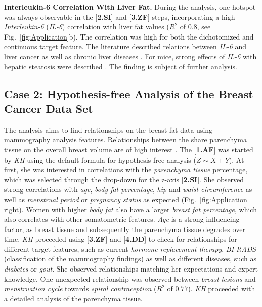 \documentclass[journal]{style/vgtc} 			          %
\begin{document}
\textbf{Interleukin-6 Correlation With Liver Fat.}
During the analysis, one hotspot was always observable in the [\textbf{2.SI}] and [\textbf{3.ZF}] steps, incorporating a high \emph{Interleukin-6} (\emph{IL-6}) correlation with liver fat values ($R^2$ of $0.8$, see Fig.~\ref{fig:Application}b).
The correlation was high for both the dichotomized and continuous target feature.
The literature described relations between \emph{IL-6} and liver cancer \cite{He2013} as well as chronic liver diseases \cite{Streetz2003}.
For mice, strong effects of \emph{IL-6} with hepatic steatosis were described \cite{Hong2004}.
The finding is subject of further analysis.
\subsection{Case 2: Hypothesis-free Analysis of the Breast Cancer Data Set}
The analysis aims to find relationships on the breast fat data using mammography analysis features.
Relationships between the share parenchyma tissue on the overall breast volume are of high interest \cite{Mccormack2006}.
The [\textbf{1.AF}] was started by \emph{KH} using the default formula for hypothesis-free analysis ($Z \sim X + Y$).
At first, she was interested in correlations with the \emph{parenchyma tissue} percentage, which was selected through the drop-down for the z-axis [\textbf{2.SI}].
She observed strong correlations with \emph{age}, \emph{body fat percentage}, \emph{hip} and \emph{waist circumference} as well as \emph{menstrual period} or \emph{pregnancy status} as expected (Fig.~\ref{fig:Application} right).
Women with higher \emph{body fat} also have a larger \emph{breast fat percentage}, which also correlates with other somatometric features.
\emph{Age} is a strong influencing factor, as breast tissue and subsequently the parenchyma tissue degrades over time.
\emph{KH} proceeded using [\textbf{3.ZF}] and [\textbf{4.DD}] to check for relationships for different target features, such as current \emph{hormone replacement therapy}, \emph{BI-RADS} (classification of the mammography findings) as well as different diseases, such as \emph{diabetes} or \emph{gout}.
She observed relationships matching her expectations and expert knowledge.
One unexpected relationship was observed between \emph{breast lesions} and \emph{menstruation cycle} towards \emph{spiral contraception} ($R^2$ of $0.77$).
\emph{KH} proceeded with a detailed analysis of the parenchyma tissue.
\end{document}
